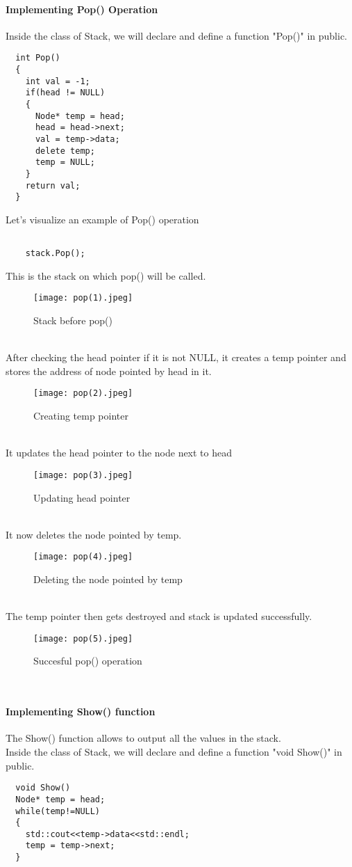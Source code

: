 \documentclass[11pt,fleqn]{book} %
\begin{document}
\paragraph{Implementing Pop() Operation}
Inside the class of Stack, we will declare and define a function "Pop()" in public.
\begin{lstlisting}
  int Pop()
  {
    int val = -1;
    if(head != NULL)
    {
      Node* temp = head;
      head = head->next;
      val = temp->data;
      delete temp;
      temp = NULL;
    }
    return val;
  }
\end{lstlisting}
Let's visualize an example of Pop() operation
\begin{example}
  \begin{lstlisting}
    
    stack.Pop();
  \end{lstlisting}
  This is the stack on which pop() will be called.
  \begin{figure}[H]
    \centering
    \texttt{[image: pop(1).jpeg]}
    \caption{Stack before pop()}
  \end{figure} ~\\
  After checking the head pointer if it is not NULL, it creates a temp pointer and stores the address of node pointed by head in it.
  \begin{figure}[H]
    \centering
    \texttt{[image: pop(2).jpeg]}
    \caption{Creating temp pointer}
  \end{figure} ~\\
  It updates the head pointer to the node next to head
  \begin{figure}[H]
    \centering
    \texttt{[image: pop(3).jpeg]}
    \caption{Updating head pointer}
  \end{figure} ~\\
  It now deletes the node pointed by temp.
  \begin{figure}[H]
    \centering
    \texttt{[image: pop(4).jpeg]}
    \caption{Deleting the node pointed by temp}
  \end{figure} ~\\
  The temp pointer then gets destroyed and stack is updated successfully.
  \begin{figure}[H]
    \centering
    \texttt{[image: pop(5).jpeg]}
    \caption{Succesful pop() operation}
  \end{figure}
\end{example} ~\\
\paragraph{Implementing Show() function}
The Show()  function allows to output all the values in the stack. \\
Inside the class of Stack, we will declare and define a function "void Show()" in public.
\begin{lstlisting}
  void Show()
  Node* temp = head;
  while(temp!=NULL)
  {
    std::cout<<temp->data<<std::endl;
    temp = temp->next;
  }
\end{lstlisting}
\end{document}
